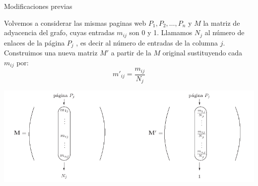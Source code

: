 \documentclass[ignorenonframetext,aspectratio=43,]{beamer}
\begin{document}
\begin{frame}{Modificaciones previas}
\begin{center}
Volvemos a considerar las mismas paginas web $P_1, P_2, \dots, P_n$ y $M$ la matriz de adyacencia del grafo, cuyas entradas $m_{ij}$ son 0 y 1. Llamamos $N_j$ al número de enlaces de la página $P_j$ , es decir al número de entradas de la columna $j$. Construimos una nueva matriz $M'$ a partir de la $M$ original sustituyendo cada $m_{ij}$ por:
$$m'_{ij} = \frac{m_{ij}}{N_j} $$

\includegraphics[width=1.0\textwidth]{./img/markov}
\end{center}
\end{frame}
\end{document}
